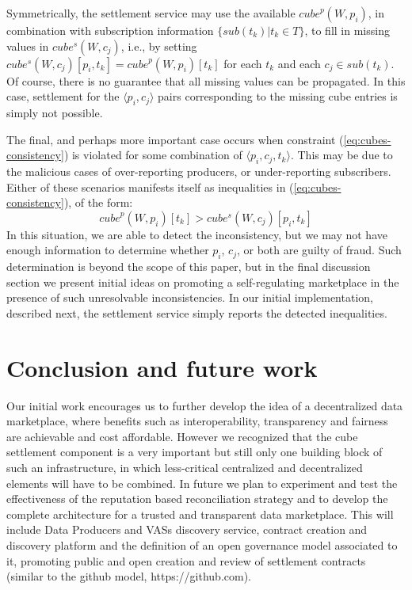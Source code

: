 \documentclass[chi_draft]{sigchi}
\begin{document}
{Symmetrically, the settlement service may use the available $ \mathit{cube}^p(W, p_i)$, in combination with subscription information $ \{\mathit{sub}(t_k) | t_k \in T \}$, to fill in missing values in 
$  \mathit{cube^s}(W, c_j)  $, i.e., by setting 
$ \mathit{cube^s}(W, c_j)[p_i, t_k]  =  \mathit{cube}^p(W, p_i)[t_k]$ for each $t_k$ and each $c_j \in \mathit{sub}(t_k)$.
%
Of course, there is no guarantee that all missing values can be propagated. 
In this case, settlement for the $\langle p_i, c_j \rangle$ pairs corresponding to the missing cube entries is simply not possible.

The final, and perhaps more important case occurs when constraint (\ref{eq:cubes-consistency}) is violated for some combination of $\langle p_i, c_j, t_k \rangle$.
This may be due to the malicious cases of over-reporting producers, or under-reporting subscribers.
%
Either of these  scenarios manifests itself as inequalities in (\ref{eq:cubes-consistency}), of the form:
\begin{equation}\label{eq:inconsistencies}
\mathit{cube}^p(W, p_i)[t_k] > \mathit{cube^s}(W, c_j)[p_i, t_k]
\end{equation}
In this situation, we are able to detect the inconsistency, but we may not have enough information to determine whether $p_i$, $c_j$, or both are guilty of fraud.
Such determination is beyond the scope of this paper, but in the final discussion section we present initial ideas on promoting a self-regulating marketplace in the presence of such unresolvable inconsistencies.
%
In our initial implementation, described next, the settlement service simply reports the detected inequalities.



\section{Conclusion and future work}
Our initial work encourages us to further develop the idea of a decentralized data marketplace, where benefits such as interoperability, transparency and fairness are achievable and cost affordable. However we recognized that the cube settlement component is a very important but still only one building block of such an infrastructure, in which less-critical centralized and decentralized elements will have to be combined. In future we plan to experiment and test the effectiveness of the reputation based reconciliation strategy and to develop the complete architecture for a trusted and transparent data marketplace. This will include Data Producers and VASs discovery service, contract creation and discovery platform and the definition of an open governance model associated to it, promoting public and open creation and review of settlement contracts (similar to the github model, https://github.com).



}
\end{document}
